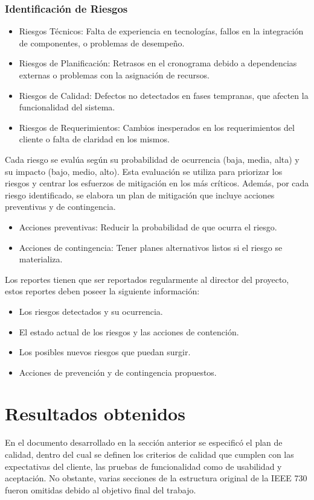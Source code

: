 \documentclass[a4paper,10pt]{article}
\begin{document}
	\subsubsection{Identificación de Riesgos}
	\begin{itemize}
		\item Riesgos Técnicos: Falta de experiencia en tecnologías, fallos en la integración de componentes, o problemas de desempeño.
		\item Riesgos de Planificación: Retrasos en el cronograma debido a dependencias externas o problemas con la asignación de recursos.
		\item Riesgos de Calidad: Defectos no detectados en fases tempranas, que afecten la funcionalidad del sistema.
		\item Riesgos de Requerimientos: Cambios inesperados en los requerimientos del cliente o falta de claridad en los mismos.
	\end{itemize}
	
	Cada riesgo se evalúa según su probabilidad de ocurrencia (baja, media, alta) y su impacto (bajo, medio, alto). Esta evaluación se utiliza para priorizar los riesgos y centrar los esfuerzos de mitigación en los más críticos. Además, por cada riesgo identificado, se elabora un plan de mitigación que incluye acciones preventivas y de contingencia.
	
	\begin{itemize}
		\item Acciones preventivas: Reducir la probabilidad de que ocurra el riesgo.
		\item Acciones de contingencia: Tener planes alternativos listos si el riesgo se materializa.
	\end{itemize}
	
	Los reportes tienen que ser reportados regularmente al director del proyecto, estos reportes deben poseer la siguiente información:
	\begin{itemize}
		\item Los riesgos detectados y su ocurrencia.
		\item El estado actual de los riesgos y las acciones de contención.
		\item Los posibles nuevos riesgos que puedan surgir.
		\item Acciones de prevención y de contingencia propuestos.
	\end{itemize}
	
	\section{Resultados obtenidos}
	En el documento desarrollado en la sección anterior se especificó el plan de calidad, dentro del cual se definen los criterios de calidad que cumplen con las expectativas del cliente, las pruebas de funcionalidad como de usabilidad y aceptación. No obstante, varias secciones de la estructura original de la IEEE 730 fueron omitidas debido al objetivo final del trabajo.
	
\end{document}
